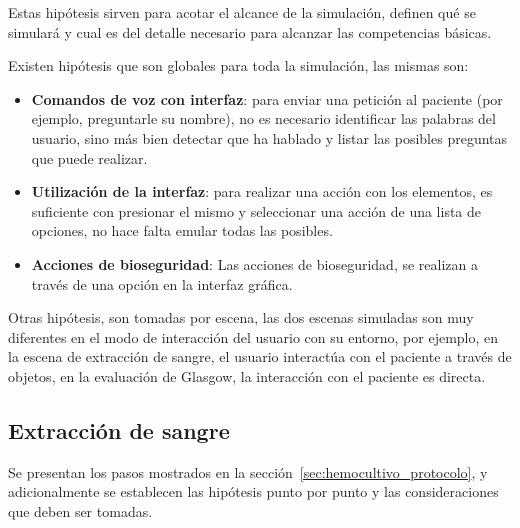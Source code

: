 Estas hipótesis sirven para acotar el alcance de la simulación, definen qué se
simulará y cual es del detalle necesario para alcanzar las competencias básicas.

Existen hipótesis que son globales para toda la simulación, las mismas son:

\begin{itemize}

    \item \textbf{Comandos de voz con interfaz}: para enviar una petición al
        paciente (por ejemplo, preguntarle su nombre), no es necesario
        identificar las palabras del usuario, sino más bien detectar que ha
        hablado y listar las posibles preguntas que puede realizar.

    \item \textbf{Utilización de la interfaz}: para realizar una acción con los
        elementos, es suficiente con presionar el mismo y seleccionar una acción
        de una lista de opciones, no hace falta emular todas las posibles.

    \item \textbf{Acciones de bioseguridad}: Las
        acciones de bioseguridad, se realizan a través de una opción en la
        interfaz gráfica.

\end{itemize}

Otras hipótesis, son tomadas por escena, las dos escenas simuladas son muy
diferentes en el modo de interacción del usuario con su entorno, por ejemplo, en
la escena de extracción de sangre, el usuario interactúa con el paciente a
través de objetos, en la evaluación de Glasgow, la interacción con el paciente
es directa.

\subsection{Extracción de sangre}

Se presentan los pasos mostrados en la sección~\ref{sec:hemocultivo_protocolo},
y adicionalmente se establecen las hipótesis punto por punto y las
consideraciones que deben ser tomadas.

